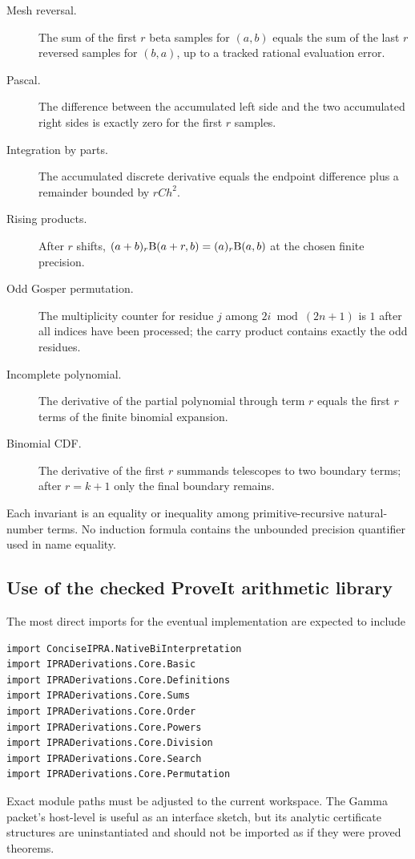 \begin{description}
\item[Mesh reversal.]  The sum of the first $r$ beta samples for $(a,b)$ equals the sum of the last $r$ reversed samples for $(b,a)$, up to a tracked rational evaluation error.
\item[Pascal.]  The difference between the accumulated left side and the two accumulated right sides is exactly zero for the first $r$ samples.
\item[Integration by parts.]  The accumulated discrete derivative equals the endpoint difference plus a remainder bounded by $rCh^2$.
\item[Rising products.]  After $r$ shifts,
$(a+b)_r\mathrm B(a+r,b)=(a)_r\mathrm B(a,b)$ at the chosen finite precision.
\item[Odd Gosper permutation.]  The multiplicity counter for residue $j$ among $2i\bmod(2n+1)$ is $1$ after all indices have been processed; the carry product contains exactly the odd residues.
\item[Incomplete polynomial.]  The derivative of the partial polynomial through term $r$ equals the first $r$ terms of the finite binomial expansion.
\item[Binomial CDF.]  The derivative of the first $r$ summands telescopes to two boundary terms; after $r=k+1$ only the final boundary remains.
\end{description}

Each invariant is an equality or inequality among primitive-recursive natural-number terms.  No induction formula contains the unbounded precision quantifier used in name equality.

\subsection{Use of the checked ProveIt arithmetic library}

The most direct imports for the eventual implementation are expected to include
\begin{lstlisting}[language={}]
import ConciseIPRA.NativeBiInterpretation
import IPRADerivations.Core.Basic
import IPRADerivations.Core.Definitions
import IPRADerivations.Core.Sums
import IPRADerivations.Core.Order
import IPRADerivations.Core.Powers
import IPRADerivations.Core.Division
import IPRADerivations.Core.Search
import IPRADerivations.Core.Permutation
\end{lstlisting}
Exact module paths must be adjusted to the current workspace.  The Gamma packet's host-level  is useful as an interface sketch, but its analytic certificate structures are uninstantiated and should not be imported as if they were proved theorems.

